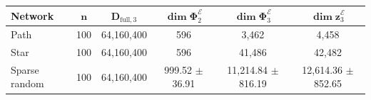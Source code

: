 \begingroup
\small
\setlength{\tabcolsep}{3pt}
\begin{tabular}{lccccc}
\toprule
\textbf{Network} & $\mathbf{n}$ & $\mathbf{D}_{\mathrm{full},3}$ & $\mathbf{\dim\Phi}_2^{\mathcal{E}}$ & $\mathbf{\dim\Phi}_3^{\mathcal{E}}$ & $\mathbf{\dim z}_3^{\mathcal{E}}$ \\
\midrule
Path & 100 & 64,160,400 & 596 & 3,462 & 4,458 \\
Star & 100 & 64,160,400 & 596 & 41,486 & 42,482 \\
Sparse random & 100 & 64,160,400 & 999.52 $\pm$ 36.91 & 11,214.84 $\pm$ 816.19 & 12,614.36 $\pm$ 852.65 \\
\bottomrule
\end{tabular}
\endgroup
